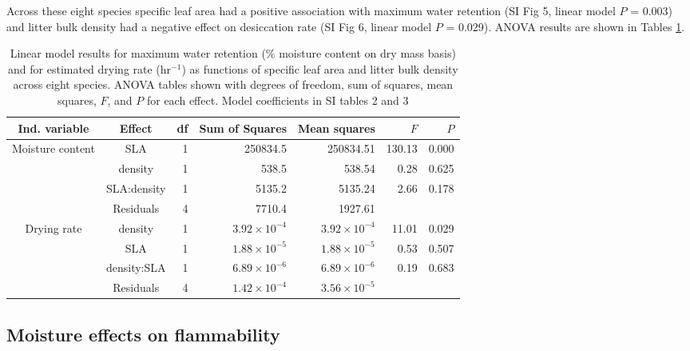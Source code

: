 \documentclass[letterpaper,12pt]{article}
\begin{document}
Across these eight species specific leaf area had a positive association with maximum
water retention (SI Fig 5, linear model $P$ = 0.003) and litter
bulk density had a negative effect on desiccation rate (SI Fig 6,
linear model $P$ = 0.029). ANOVA results are shown in Tables
\ref{tab:mc_di_anova}.

\begin{table}[h]
  \caption{Linear model results for maximum water retention (\% moisture
    content on dry mass basis) and for estimated drying rate (hr$^{-1}$) as
    functions of specific leaf area and litter bulk density across eight
    species. ANOVA tables shown with degrees of freedom, sum of squares, mean
    squares, $F$, and $P$ for each effect. Model coefficients in SI tables 2 and 3}
  \label{tab:mc_di_anova}
\centering

\begin{tabular}{ccrrrrr}
  \toprule
Ind. variable & Effect & df & Sum of Squares & Mean squares & $F$ & $P$ \\ 
  \midrule
Moisture content & SLA & 1 & 250834.5 & 250834.51 & 130.13 & 0.000 \\ 
  & density & 1 & 538.5 & 538.54 & 0.28 & 0.625 \\ 
  & SLA:density & 1 & 5135.2 & 5135.24 & 2.66 & 0.178 \\ 
  & Residuals & 4 & 7710.4 & 1927.61 &  &  \\ 
  \midrule
  
Drying rate & density & 1 & $3.92 \times 10^{-4}$ & $3.92 \times 10^{-4}$ & 11.01 & 0.029 \\ 
 &  SLA & 1 & $1.88 \times 10^{-5}$ & $1.88 \times 10^{-5}$ & 0.53 & 0.507 \\ 
 &  density:SLA & 1 & $6.89 \times 10^{-6}$ & $6.89 \times 10^{-6}$ & 0.19 & 0.683 \\ 
 &  Residuals & 4 & $1.42 \times 10^{-4}$ & $3.56 \times 10^{-5}$ &  &  \\ 
   \bottomrule

\end{tabular}
\end{table}


\subsection*{Moisture effects on flammability}
\end{document}
